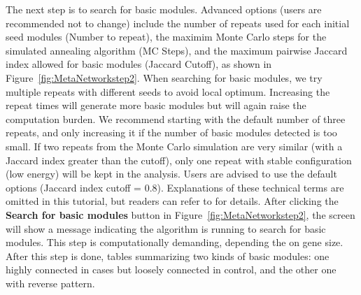 \begin{steps}
The next step is to search for basic modules.
Advanced options (users are recommended not to change) 
include the number of repeats used for each initial seed modules (Number to repeat),
the maximim Monte Carlo steps for the simulated annealing algorithm (MC Steps),
and the maximum pairwise Jaccard index allowed for basic modules (Jaccard Cutoff), as shown in Figure~\ref{fig:MetaNetworkstep2}.
When searching for basic modules, 
we try multiple repeats with different seeds to avoid local optimum. 
Increasing the repeat times will generate more basic modules but will again raise the computation burden. 
We recommend starting with the default number of three repeats, 
and only increasing it if the number of basic modules detected is too small.
If two repeats from the Monte Carlo simulation are very similar (with a Jaccard index greater than the cutoff),
only one repeat with stable configuration (low energy) will be kept in the analysis.
Users are advised to use the default options (Jaccard index cutoff = 0.8).
Explanations of these technical terms are omitted in this tutorial,
but readers can refer to \cite{zhu2016metadcn} for details.
After clicking the \textbf{Search for basic modules} button in Figure~\ref{fig:MetaNetworkstep2}, 
the screen will show a message indicating the algorithm is running to search for basic modules.
This step is computationally demanding, depending the on gene size.
After this step is done,
tables summarizing two kinds of basic modules: one highly connected in cases but loosely connected in control, and the other one with reverse pattern. 


\end{steps}
